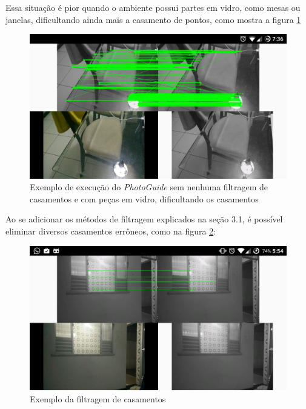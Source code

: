 Essa situação é pior quando o ambiente possui partes em vidro, como mesas ou janelas, dificultando ainda mais a casamento de pontos, como mostra a figura \ref{fig4:3}

\begin{figure}[H]
	\centering
		\includegraphics[width= \textwidth]{Imagens/figura4-3.png}
	\caption{Exemplo de execução do \textit{PhotoGuide} sem nenhuma filtragem de casamentos e com peças em vidro, dificultando os casamentos}
	\label{fig4:3}
\end{figure}

Ao se adicionar os métodos de filtragem explicados na seção 3.1, é possível eliminar diversos casamentos errôneos, como na figura \ref{fig4:4}:

\begin{figure}[H]
	\centering
		\includegraphics[width= \textwidth]{Imagens/figura3-2E4-4.png}
	\caption{Exemplo da filtragem de casamentos}
	\label{fig4:4}
\end{figure}

